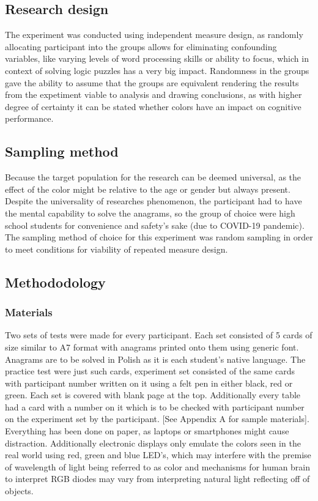 \documentclass[12pt, a4]{article}
\begin{document}
\subsection*{Research design}
The experiment was conducted using independent measure design, as randomly allocating participant into the groups allows for eliminating confounding variables, like varying 
levels of word processing skills or ability to focus, which in context of solving logic puzzles has a very big impact. Randomness in the groups gave the ability to assume that 
the groups are equivalent rendering the results from the expetiment viable to analysis and drawing conclusions, as with higher degree of certainty it can be stated whether colors
have an impact on cognitive performance.
\subsection*{Sampling method}
Because the target population for the research can be deemed universal, as the effect of the color might be relative to the age or gender but always present. Despite the universality
of researches phenomenon, the participant had to have the mental capability to solve the anagrams, so the group of choice were high school students for convenience and safety's 
sake (due to COVID-19 pandemic). The sampling method of choice for this experiment was random sampling in order to meet conditions for viability of repeated measure design. 
\subsection*{Methododology}
\subsubsection*{Materials}
Two sets of tests were made for every participant. Each set consisted of 5 cards of size similar to A7 format with anagrams printed onto them using generic font. 
Anagrams are to be solved in Polish as it is each student's native language. The practice test were just such cards, experiment set consisted of the same cards with participant 
number written on it using a felt pen in either black, red or green. Each set is covered with blank page at the top. Additionally every table had a card with a number on 
it which is to be checked with participant number on the experiment set by the participant. [See Appendix A for sample materials]. Everything has been done on paper, as laptops
or smartphones might cause distraction. Additionally electronic displays only emulate the colors seen in the real world using red, green and blue LED's, which may interfere with 
the premise of wavelength of light being referred to as color and mechanisms for human brain to interpret RGB diodes may vary from interpreting natural light reflecting off of 
objects.
\end{document}
